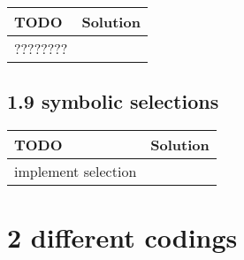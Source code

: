  \begin{tabular}{|p{}|p{}|}
 \hline
 \textbf{TODO} &
 \textbf{Solution} 
\\
 \hline
	???????? &
  
\\ 	\hline
 \end{tabular} \subsection*{1.9 symbolic selections}
 \begin{tabular}{|p{}|p{}|}
 \hline
 \textbf{TODO} &
 \textbf{Solution} 
\\
 \hline
	implement selection &
  
\\ 	\hline
 \end{tabular} \section*{2 different codings}
